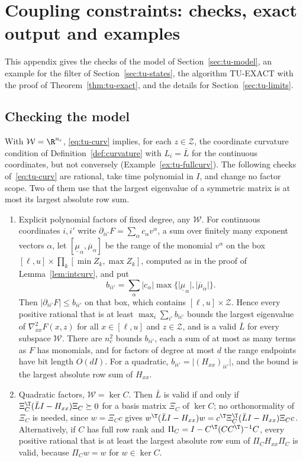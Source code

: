 \section{Coupling constraints: checks, exact output and examples}\label{app:tu}

This appendix gives the checks of the model of Section~\ref{sec:tu-model}, an
example for the filter of Section~\ref{sec:tu-states}, the algorithm TU-EXACT
with the proof of Theorem~\ref{thm:tu-exact}, and the details for
Section~\ref{sec:tu-limits}.

\subsection{Checking the model}\label{app:tu-model}

\begin{remark}\label{rem:tu-curv}
With $\mathcal W=\R^{n_c}$, \eqref{eq:tu-curv} implies, for each
$z\in\mathcal Z$, the coordinate curvature condition of
Definition~\ref{def:curvature} with $L_i=\bar L$ for the continuous
coordinates, but not conversely (Example~\ref{ex:tu-fullcurv}). The following
checks of~\eqref{eq:tu-curv} are rational, take time polynomial in $I$, and
change no factor scope. Two of them use that the largest eigenvalue of a
symmetric matrix is at most its largest absolute row sum.
\begin{enumerate}[label=(\roman*)]
\item Explicit polynomial factors of fixed degree, any $\mathcal W$. For
continuous coordinates $i,i'$ write $\partial_{ii'}F=\sum_\alpha c_\alpha v^\alpha$,
a sum over finitely many exponent vectors $\alpha$, let
$[\underline\mu_\alpha,\overline\mu_\alpha]$ be the range of the monomial
$v^\alpha$ on the box $[\ell,u]\times\prod_k[\min Z_k,\max Z_k]$,
computed as in the proof of Lemma~\ref{lem:intcurv}, and put
\[
b_{ii'}=\sum_\alpha\lvert c_\alpha\rvert\max\bigl\{\lvert\underline\mu_\alpha\rvert,\lvert\overline\mu_\alpha\rvert\bigr\}.
\]
Then $\lvert\partial_{ii'}F\rvert\le b_{ii'}$ on that box, which contains
$[\ell,u]\times\mathcal Z$. Hence every positive rational that is at least
$\max_i\sum_{i'}b_{ii'}$ bounds the largest eigenvalue of
$\nabla^2_{xx}F(x,z)$ for all $x\in[\ell,u]$ and $z\in\mathcal Z$, and is a
valid $\bar L$ for every subspace $\mathcal W$. There are $n_c^2$ bounds
$b_{ii'}$, each a sum of at most as many terms as $F$ has monomials, and for
factors of degree at most $d$ the range endpoints have bit length $O(dI)$.
For a quadratic,
$b_{ii'}=\lvert(H_{xx})_{ii'}\rvert$, and the bound is the largest absolute
row sum of $H_{xx}$.
\item Quadratic factors, $\mathcal W=\ker C$. Then $\bar L$ is valid if and
only if $\Xi_C^{\T}(\bar LI-H_{xx})\Xi_C\succeq0$ for a basis matrix $\Xi_C$
of $\ker C$; no orthonormality of $\Xi_C$ is needed, since $w=\Xi_Cc$ gives
$w^{\T}(\bar LI-H_{xx})w=c^{\T}\Xi_C^{\T}(\bar LI-H_{xx})\Xi_Cc$.
Alternatively, if $C$ has full row rank and
$\Pi_C=I-C^{\T}(CC^{\T})^{-1}C$, every positive rational that is at least
the largest absolute row sum of $\Pi_CH_{xx}\Pi_C$ is valid, because
$\Pi_Cw=w$ for $w\in\ker C$.
\end{enumerate}
\end{remark}

